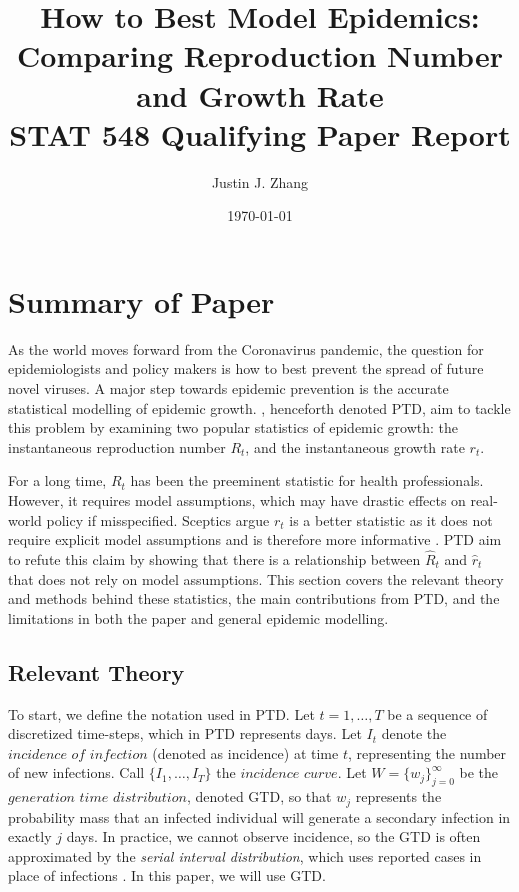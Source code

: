 \documentclass[12pt]{article}
\title{How to Best Model Epidemics: \\
Comparing Reproduction Number and Growth Rate \\
\large STAT 548 Qualifying Paper Report} %
\author{Justin J. Zhang} %
\date{\today} %
\begin{document}
\maketitle
\newpage
  \section{Summary of Paper}
    As the world moves forward from the Coronavirus pandemic, the question for epidemiologists and policy makers is how to 
    best prevent the spread of future novel viruses. A major step towards epidemic prevention is the accurate statistical 
    modelling of epidemic growth. \citep{Parag2022}, henceforth denoted PTD, aim to tackle this problem by examining 
    two popular statistics of epidemic growth: the instantaneous reproduction number $R_t$, 
    and the instantaneous growth rate $r_t$. 

    For a long time, $R_t$ has been the preeminent statistic for health professionals. However, it requires model assumptions, which
    may have drastic effects on real-world policy if misspecified.
    Sceptics argue $r_t$ is a better statistic as it does not require explicit
    model assumptions and is therefore more informative \citep{Pellis2022}. PTD aim to refute this claim by showing that there is a relationship 
    between $\hat{R}_t$ and $\hat{r}_t$ that does not rely on model assumptions. 
    This section covers the relevant theory and methods behind these statistics, the main contributions from PTD, 
    and the limitations in both the paper and general epidemic modelling.

    \subsection{Relevant Theory}
      To start, we define the notation used in PTD. Let $t= 1,\dots,T$ be a sequence of discretized time-steps, which in PTD
      represents days. Let $I_t$ denote the $\textit{incidence of infection}$ (denoted as incidence) at time $t$, representing the number of new infections.
      Call $\{I_1,\dots,I_T\}$ the $\textit {incidence curve}$. 
      Let $W = \{w_j\}_{j=0}^\infty$ be the $\textit{generation time distribution}$, denoted GTD, so that $w_j$ represents
      the probability mass that an infected individual will generate a secondary infection in exactly $j$ days. In practice, 
      we cannot observe incidence, so the GTD is often approximated by the \textit{serial interval distribution}, which uses reported cases
      in place of infections \citep{Cori2013}. In this paper, we will use GTD. 
      
\end{document}
